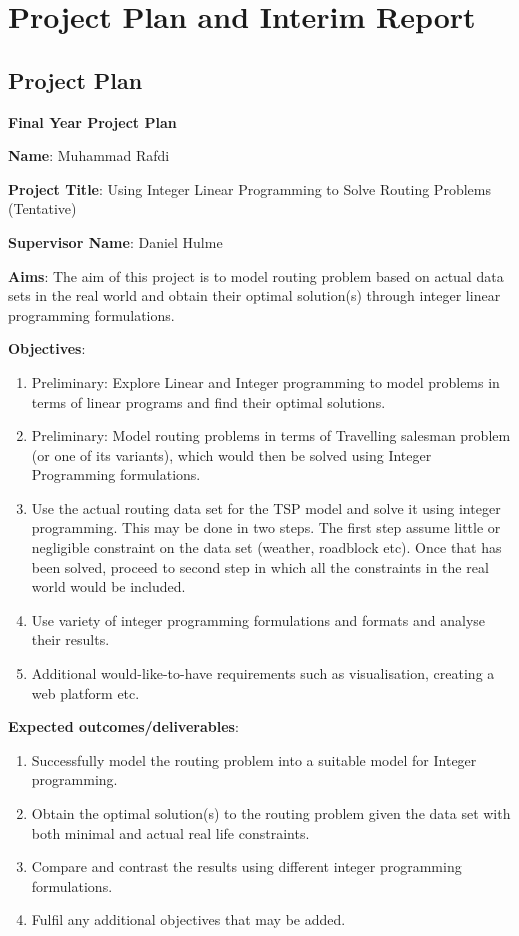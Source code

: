 \chapter{Project Plan and Interim Report}
\section{Project Plan}
\textbf{Final Year Project Plan}

\textbf{Name}: Muhammad Rafdi

\textbf{Project Title}: Using Integer Linear Programming to Solve Routing Problems (Tentative)

\textbf{Supervisor Name}: Daniel Hulme

\textbf{Aims}: The aim of this project is to model routing problem based on actual data sets in the real world and obtain their optimal solution(s) through integer linear programming formulations.

\textbf{Objectives}:
\begin{enumerate}
    \item Preliminary: Explore Linear and Integer programming to model problems in terms of linear programs and find their optimal solutions.
    \item Preliminary: Model routing problems in terms of Travelling salesman problem (or one of its variants), which would then be solved using Integer Programming formulations.
    \item Use the actual routing data set for the TSP model and solve it using integer programming. This may be done in two steps. The first step assume little or negligible constraint on the data set (weather, roadblock etc). Once that has been solved, proceed to second step in which all the constraints in the real world would be included.
    \item Use variety of integer programming formulations and formats and analyse their results.
    \item Additional would-like-to-have requirements such as visualisation, creating a web platform etc.
\end{enumerate}

\textbf{Expected outcomes/deliverables}:
\begin{enumerate}
    \item Successfully model the routing problem into a suitable model for Integer programming.
    \item Obtain the optimal solution(s) to the routing problem given the data set with both minimal and actual real life constraints.
    \item Compare and contrast the results using different integer programming formulations.
    \item Fulfil any additional objectives that may be added.
\end{enumerate}

